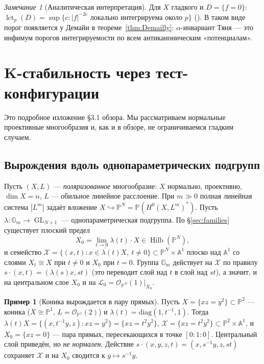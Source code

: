 \documentclass[11pt,a4paper]{article}
\theoremstyle{plain}
\theoremstyle{definition}
\newtheorem{example}[theorem]{Пример}
\theoremstyle{remark}
\newtheorem{remark}[theorem]{Замечание}
\newcommand{\PP}{\mathbb{P}}
\newcommand{\A}{\mathbb{A}}
\newcommand{\Gm}{\mathbb{G}_m}
\newcommand{\cO}{\mathcal{O}}
\newcommand{\cL}{\mathcal{L}}
\newcommand{\cX}{\mathcal{X}}
\DeclareMathOperator{\GL}{GL}
\DeclareMathOperator{\lct}{lct}
\DeclareMathOperator{\Hilb}{Hilb}
\begin{document}
\begin{remark}[Аналитическая интерпретация]
Для $X$ гладкого и $D=\{f=0\}$: $\lct_p(D)=\sup\{c:|f|^{-2c}\text{ локально интегрируема около }p\}$
(\cite[8.5]{KolPairs}). В таком виде порог появляется у Демайи в теореме~\ref{thm:Demailly}:
$\alpha$-инвариант Тяня --- это инфимум порогов интегрируемости по всем антиканоническим
«потенциалам».
\end{remark}

\section{K-стабильность через тест-конфигурации}\label{sec:tc}

Это подробное изложение \S3.1 обзора. Мы рассматриваем нормальные проективные многообразия и, как
и в обзоре, не ограничиваемся гладким случаем.

\subsection{Вырождения вдоль однопараметрических подгрупп}

Пусть $(X,L)$ --- \emph{поляризованное} многообразие: $X$ нормально, проективно, $\dim X=n$, $L$ ---
обильное линейное расслоение. При $m\gg0$ полная линейная система $|L^m|$ задаёт вложение
$X\hookrightarrow\PP^N=\PP(H^0(X,L^m)^*)$. Пусть $\lambda\colon\Gm\to\GL_{N+1}$ --- однопараметрическая
подгруппа. По \S\ref{sec:families} существует плоский предел
\[
X_0=\lim_{t\to0}\lambda(t)\cdot X\in\Hilb(\PP^N),
\]
и семейство $\cX=\overline{\{(x,t):x\in\lambda(t)X,\ t\ne0\}}\subset\PP^N\times\A^1$ плоско над $\A^1$
со слоями $X_t\cong X$ при $t\ne0$ и $X_0$ при $t=0$. Группа $\Gm$ действует на $\cX$ по правилу
$s\cdot(x,t)=(\lambda(s)x,st)$ (это переводит слой над $t$ в слой над $st$), а значит, и на
центральном слое $X_0$ и на $\cL_0=\cO_{\PP^N}(1)|_{X_0}$.

\begin{example}[Коника вырождается в пару прямых]\label{ex:conic-tc}
Пусть $X=\{xz=y^2\}\subset\PP^2$ --- коника ($X\cong\PP^1$, $L=\cO_{\PP^1}(2)$) и
$\lambda(t)=\mathrm{diag}(1,t^{-1},1)$. Тогда $\lambda(t)X=\{(x,t^{-1}y,z):xz=y^2\}=\{xz=t^2y^2\}$,
$\cX=\{xz=t^2y^2\}\subset\PP^2\times\A^1$, и $X_0=\{xz=0\}$ --- пара прямых, пересекающихся в
точке $[0:1:0]$. Центральный слой приведён, но \emph{не нормален}. Действие $s\cdot(x,y,z,t)=
(x,s^{-1}y,z,st)$ сохраняет $\cX$ и на $X_0$ сводится к $y\mapsto s^{-1}y$.
\end{example}
\end{document}
